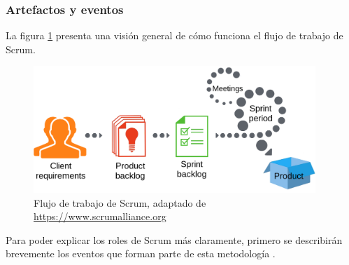 \subsubsection{Artefactos y eventos}

La figura \ref{fig:scrum} presenta una visión general de cómo funciona el flujo de trabajo de Scrum.

\begin{figure}[!h]
\begin{center}
\includegraphics[width=0.95\textwidth]{imagenes/5/scrum.png}
\caption{Flujo de trabajo de Scrum, adaptado de \url{https://www.scrumalliance.org}}
\label{fig:scrum}
\end{center}
\end{figure}

Para poder explicar los roles de Scrum más claramente, primero se describirán brevemente los eventos que forman parte de esta metodología \cite{scrum-guide}.

